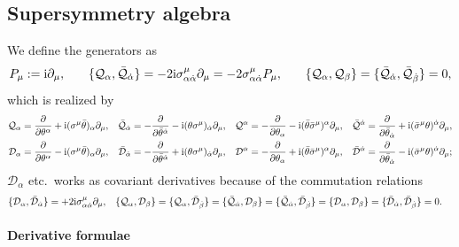\documentclass[CheatSheet]{subfiles}
\newcommand{\OQ}{{\mathcal Q}}
\newcommand{\OD}{{\mathcal D}}
\begin{document}
\subsection{Supersymmetry algebra}
We define the generators as
\begin{alignat}{3}
 P_\mu
 &:= \ii\partial_\mu,
\quad&
 \{\OQ_\alpha, \bar \OQ_\dalpha\}
 &= -2\ii\sigma^{\mu}_{\alpha\dalpha}\partial_\mu = -2\sigma^{\mu}_{\alpha\dalpha}P_\mu,
\quad&
  \{\OQ_\alpha, \OQ_\beta\} =   \{\bar \OQ_\dalpha, \bar \OQ_\dbeta\} = 0,
\end{alignat}
which is realized by
\begin{align*}
\OQ_\alpha &= \frac{\partial}{\partial \theta^{\alpha}}+\ii (\sigma^{\mu}\btheta){}_{\alpha}\partial_{\mu},
&
\bar \OQ_\dalpha&=-\frac{\partial}{\partial \btheta^{\dalpha}}-\ii (\theta \sigma^{\mu}){}_{\dalpha}\partial_{\mu},
&
\OQ^\alpha&=-\frac{\partial}{\partial \theta_{\alpha}}-\ii (\btheta\bsigma^{\mu})^{\alpha}\partial_{\mu},
&
\bar \OQ^{\dalpha}&=\frac{\partial}{\partial \btheta_{\dalpha}}+\ii (\bsigma^{\mu}\theta)^{\dalpha}\partial_{\mu},
\\
\OD_\alpha&=\frac{\partial}{\partial \theta^{\alpha}}-\ii (\sigma^{\mu}\btheta){}_{\alpha}\partial_{\mu},
&
\bar \OD_\dalpha&=-\frac{\partial}{\partial \btheta^{\dalpha}}+\ii (\theta \sigma^{\mu}){}_{\dalpha}\partial_{\mu},
&
\OD^\alpha&=-\frac{\partial}{\partial \theta_{\alpha}}+\ii (\btheta\bsigma^{\mu})^{\alpha}\partial_{\mu},
&
\bar \OD^\dalpha&=\frac{\partial}{\partial \btheta_{\dalpha}}-\ii (\bsigma^{\mu}\theta)^{\dalpha}\partial_{\mu};
\end{align*}
$\OD_\alpha$ etc.~works as covariant derivatives because of the commutation relations
\begin{align*}
\{\OD_\alpha, \bar \OD_\dalpha\}&=+2\ii\sigma^{\mu}_{\alpha\dalpha}\partial_\mu,&
\{\OQ_\alpha, \OD_\beta\}&=
\{\OQ_\alpha, \bar \OD_\dbeta\}=
\{\bar \OQ_\dalpha, \OD_\beta\}=
\{\bar \OQ_\dalpha, \bar \OD_\dbeta\}=
\{\OD_\alpha, \OD_\beta\}=
\{\bar \OD_\dalpha, \bar \OD_\dbeta\}=0.
\end{align*}

\paragraph{Derivative formulae}
\end{document}

